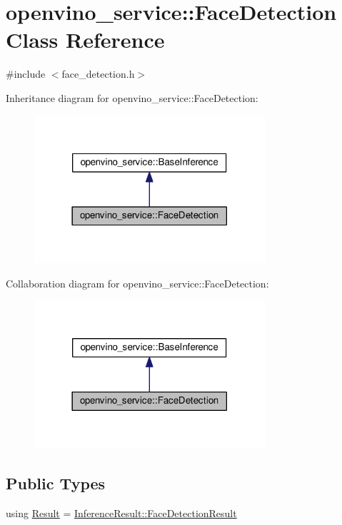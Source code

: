 \hypertarget{classopenvino__service_1_1FaceDetection}{}\section{openvino\+\_\+service\+:\+:Face\+Detection Class Reference}
\label{classopenvino__service_1_1FaceDetection}


{\ttfamily \#include $<$face\+\_\+detection.\+h$>$}



Inheritance diagram for openvino\+\_\+service\+:\+:Face\+Detection\+:
\nopagebreak
\begin{figure}[H]
\begin{center}
\leavevmode
\includegraphics[width=242pt]{classopenvino__service_1_1FaceDetection__inherit__graph}
\end{center}
\end{figure}


Collaboration diagram for openvino\+\_\+service\+:\+:Face\+Detection\+:
\nopagebreak
\begin{figure}[H]
\begin{center}
\leavevmode
\includegraphics[width=242pt]{classopenvino__service_1_1FaceDetection__coll__graph}
\end{center}
\end{figure}
\subsection*{Public Types}
\begin{DoxyCompactItemize}
\item 
using \hyperlink{classopenvino__service_1_1FaceDetection_a35ec2b5ed353d7f08a5475df7cccb249}{Result} = \hyperlink{structInferenceResult_1_1FaceDetectionResult}{Inference\+Result\+::\+Face\+Detection\+Result}
\end{DoxyCompactItemize}
